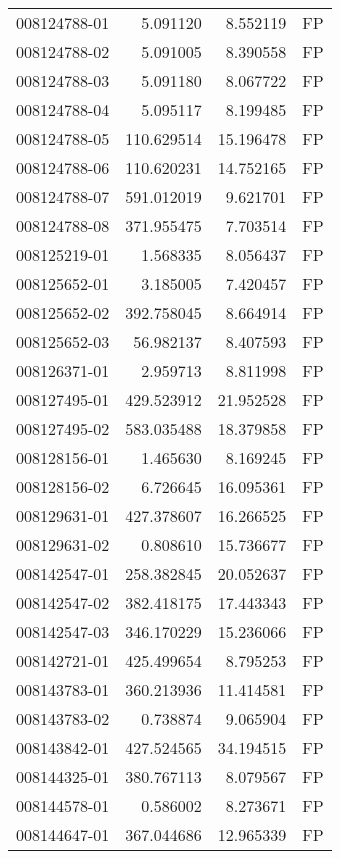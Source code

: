 \begin{tabular}{lrrl}
008124788-01 &    5.091120 &     8.552119 &   FP \\
008124788-02 &    5.091005 &     8.390558 &   FP \\
008124788-03 &    5.091180 &     8.067722 &   FP \\
008124788-04 &    5.095117 &     8.199485 &   FP \\
008124788-05 &  110.629514 &    15.196478 &   FP \\
008124788-06 &  110.620231 &    14.752165 &   FP \\
008124788-07 &  591.012019 &     9.621701 &   FP \\
008124788-08 &  371.955475 &     7.703514 &   FP \\
008125219-01 &    1.568335 &     8.056437 &   FP \\
008125652-01 &    3.185005 &     7.420457 &   FP \\
008125652-02 &  392.758045 &     8.664914 &   FP \\
008125652-03 &   56.982137 &     8.407593 &   FP \\
008126371-01 &    2.959713 &     8.811998 &   FP \\
008127495-01 &  429.523912 &    21.952528 &   FP \\
008127495-02 &  583.035488 &    18.379858 &   FP \\
008128156-01 &    1.465630 &     8.169245 &   FP \\
008128156-02 &    6.726645 &    16.095361 &   FP \\
008129631-01 &  427.378607 &    16.266525 &   FP \\
008129631-02 &    0.808610 &    15.736677 &   FP \\
008142547-01 &  258.382845 &    20.052637 &   FP \\
008142547-02 &  382.418175 &    17.443343 &   FP \\
008142547-03 &  346.170229 &    15.236066 &   FP \\
008142721-01 &  425.499654 &     8.795253 &   FP \\
008143783-01 &  360.213936 &    11.414581 &   FP \\
008143783-02 &    0.738874 &     9.065904 &   FP \\
008143842-01 &  427.524565 &    34.194515 &   FP \\
008144325-01 &  380.767113 &     8.079567 &   FP \\
008144578-01 &    0.586002 &     8.273671 &   FP \\
008144647-01 &  367.044686 &    12.965339 &   FP \\

\end{tabular}
